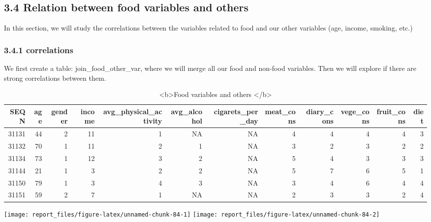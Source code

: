 \documentclass[
]{article}
\begin{document}
\hypertarget{relation-between-food-variables-and-others}{%
\subsection{3.4 Relation between food variables and
others}\label{relation-between-food-variables-and-others}}

In this section, we will study the correlations between the variables
related to food and our other variables (age, income, smoking, etc.)

\hypertarget{correlations-2}{%
\subsubsection{3.4.1 correlations}\label{correlations-2}}

We first create a table: join\_food\_other\_var, where we will merge all
our food and non-food variables. Then we will explore if there are
strong correlations between them.

\begin{table}

\caption{\label{tab:unnamed-chunk-83}<b>Food variables and others </b>}
\centering
\begin{tabular}[t]{r|r|r|r|r|r|r|r|r|r|r|r}
\hline
SEQN & age & gender & income & avg\_physical\_activity & avg\_alcohol & cigarets\_per\_day & meat\_cons & diary\_cons & vege\_cons & fruit\_cons & diet\\
\hline
31131 & 44 & 2 & 11 & 1 & NA & NA & 4 & 4 & 4 & 4 & 3\\
\hline
31132 & 70 & 1 & 11 & 2 & 1 & NA & 3 & 2 & 3 & 2 & 2\\
\hline
31134 & 73 & 1 & 12 & 3 & 2 & NA & 5 & 4 & 3 & 3 & 3\\
\hline
31144 & 21 & 1 & 3 & 2 & 2 & NA & 5 & 7 & 6 & 5 & 1\\
\hline
31150 & 79 & 1 & 3 & 4 & 3 & NA & 3 & 4 & 6 & 4 & 4\\
\hline
31151 & 59 & 2 & 7 & 1 & NA & NA & 2 & 3 & 3 & 2 & 4\\
\hline
\end{tabular}
\end{table}

\begin{center}\texttt{[image: report\_files/figure-latex/unnamed-chunk-84-1]} \texttt{[image: report\_files/figure-latex/unnamed-chunk-84-2]} \end{center}
\end{document}
